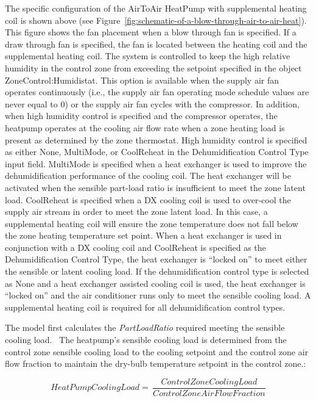 The specific configuration of the AirToAir HeatPump with supplemental heating coil is shown above (see Figure~\ref{fig:schematic-of-a-blow-through-air-to-air-heat}). This figure shows the fan placement when a blow through fan is specified. If a draw through fan is specified, the fan is located between the heating coil and the supplemental heating coil. The system is controlled to keep the high relative humidity in the control zone from exceeding the setpoint specified in the object ZoneControl:Humidistat. This option is available when the supply air fan operates continuously (i.e., the supply air fan operating mode schedule values are never equal to 0) or the supply air fan cycles with the compressor. In addition, when high humidity control is specified and the compressor operates, the heatpump operates at the cooling air flow rate when a zone heating load is present as determined by the zone thermostat. High humidity control is specified as either None, MultiMode, or CoolReheat in the Dehumidification Control Type input field. MultiMode is specified when a heat exchanger is used to improve the dehumidification performance of the cooling coil. The heat exchanger will be activated when the sensible part-load ratio is insufficient to meet the zone latent load. CoolReheat is specified when a DX cooling coil is used to over-cool the supply air stream in order to meet the zone latent load. In this case, a supplemental heating coil will ensure the zone temperature does not fall below the zone heating temperature set point. When a heat exchanger is used in conjunction with a DX cooling coil and CoolReheat is specified as the Dehumidification Control Type, the heat exchanger is ``locked on'' to meet either the sensible or latent cooling load. If the dehumidification control type is selected as None and a heat exchanger assisted cooling coil is used, the heat exchanger is ``locked on'' and the air conditioner runs only to meet the sensible cooling load. A supplemental heating coil is required for all dehumidification control types.

The model first calculates the \emph{PartLoadRatio} required meeting the sensible cooling load.~ The heatpump's sensible cooling load is determined from the control zone sensible cooling load to the cooling setpoint and the control zone air flow fraction to maintain the dry-bulb temperature setpoint in the control zone.:

\begin{equation}
HeatPumpCoolingLoad = \,\frac{{ControlZoneCoolingLoad}}{{ControlZoneAirFlowFraction}}
\end{equation}

